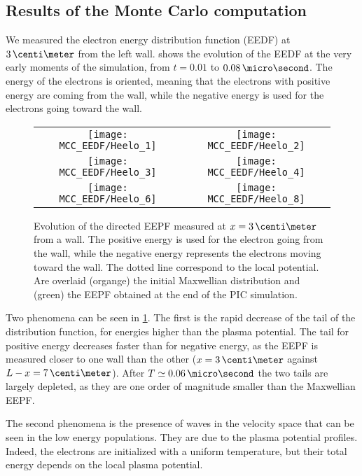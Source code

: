   \subsection{Results of the Monte Carlo computation} \label{subsec-MCMresults}

    We measured the electron energy distribution function (EEDF) at $3\,\centi\meter$ from the left wall.
     shows the evolution of the EEDF at the very early moments of the simulation, from $t=0.01$ to $0.08\,\micro\second$.
    The energy of the electrons is oriented, meaning that the electrons with positive energy are coming from the wall, while the negative energy is used for the electrons going toward the wall.

    \begin{figure}[!hbt]
      \centering
      \begin{tabular}{@{} cc}
        \texttt{[image: MCC\_EEDF/Heelo\_1]} &
        \texttt{[image: MCC\_EEDF/Heelo\_2]} \\
        \texttt{[image: MCC\_EEDF/Heelo\_3]} &
        \texttt{[image: MCC\_EEDF/Heelo\_4]} \\
        \texttt{[image: MCC\_EEDF/Heelo\_6]} &
        \texttt{[image: MCC\_EEDF/Heelo\_8]} \\
      \end{tabular}
      \caption{Evolution of the directed EEPF measured at $x=3\,\centi\meter$ from a wall. The positive energy is used for the electron going from the wall, while the negative energy represents the electrons moving toward the wall. The dotted line correspond to the local potential. Are overlaid (organge) the initial Maxwellian distribution and (green) the EEPF obtained at the end of the \acs{PIC} simulation. }
      \label{fig-zoom_init_Mc}
    \end{figure}

    Two phenomena can be seen in \cref{fig-zoom_init_Mc}.
    The first is the rapid decrease of the tail of the distribution function, for energies higher than the plasma potential.
    The tail for positive energy decreases faster than for negative energy, as the EEPF is measured closer to one wall than the other ($x=3\,\centi\meter$ against $L-x=7\,\centi\meter$).
    After $ T \simeq 0.06\,\micro\second$ the two tails are largely depleted, as they are one order of magnitude smaller than the Maxwellian EEPF.

    The second phenomena is the presence of waves in the velocity space that can be seen in the low energy populations.
    They are due to the plasma potential profiles.
    Indeed, the electrons are initialized with a uniform temperature, but their total energy depends on the local plasma potential. 

